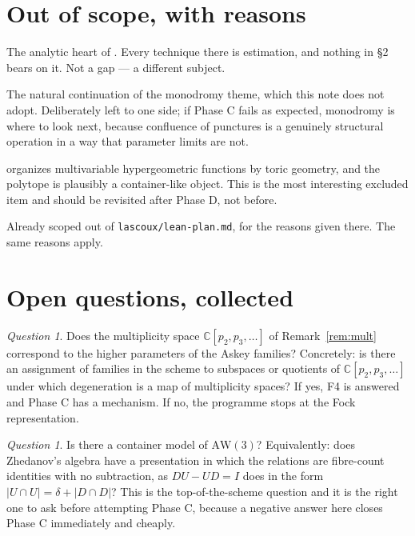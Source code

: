 \documentclass[11pt,a4paper]{article}
\theoremstyle{definition}
\theoremstyle{remark}
\newtheorem{question}[theorem]{Question}
\newcommand{\CC}{\mathbb{C}}
\newcommand{\AW}{\mathrm{AW}(3)}
\newcommand{\norm}[1]{\lvert #1 \rvert}
\begin{document}
\section{Out of scope, with reasons}

\begin{description}[leftmargin=1.8em,style=nextline,nosep]
\item[Asymptotics and orthogonality measures.] The analytic heart of \cite{AAR}. Every
technique there is estimation, and nothing in \S2 bears on it. Not a gap --- a
different subject.
\item[Painlev\'e and isomonodromy.] The natural continuation of the monodromy theme,
which this note does not adopt. Deliberately left to one side; if Phase C fails as
expected, monodromy is where to look next, because confluence of punctures is a
genuinely structural operation in a way that parameter limits are not.
\item[Multivariable and GKZ.] \cite{SST} organizes multivariable hypergeometric
functions by toric geometry, and the polytope is plausibly a container-like object.
This is the most interesting excluded item and should be revisited after Phase D, not
before.
\item[Macdonald polynomials.] Already scoped out of
\texttt{lascoux/lean-plan.md}, for the reasons given there. The same reasons apply.
\end{description}

\section{Open questions, collected}

\begin{question}\label{q:mult}
Does the multiplicity space $\CC[p_2,p_3,\dots]$ of Remark~\ref{rem:mult} correspond to
the higher parameters of the Askey families? Concretely: is there an assignment of
families in the scheme to subspaces or quotients of $\CC[p_2,p_3,\dots]$ under which
degeneration is a map of multiplicity spaces? If yes, F4 is answered and Phase C has a
mechanism. If no, the programme stops at the Fock representation.
\end{question}

\begin{question}\label{q:aw}
Is there a container model of $\AW$? Equivalently: does Zhedanov's algebra have a
presentation in which the relations are fibre-count identities with no subtraction, as
$DU - UD = I$ does in the form $\norm{U\cap U} = \delta + \norm{D\cap D}$? This is the
top-of-the-scheme question and it is the right one to ask before attempting Phase C,
because a negative answer here closes Phase C immediately and cheaply.
\end{question}
\end{document}
